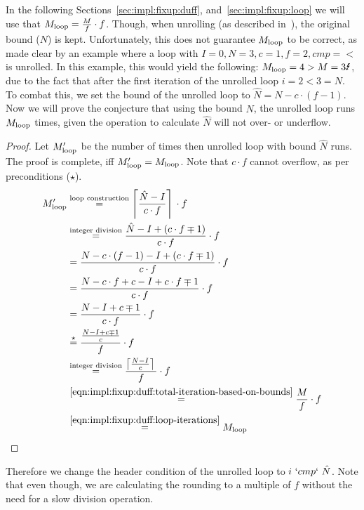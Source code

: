 In the following Sections~\ref{sec:impl:fixup:duff}, and~\ref{sec:impl:fixup:loop} we will use that $M_{\text{loop}} = \frac{M}{f} \cdot f$.
Though, when unrolling (as described in~), the original bound ($N$) is kept.
Unfortunately, this does not guarantee $M_{\text{loop}}$ to be correct, as made clear by an example where a loop with $I = 0, N = 3, c = 1, f = 2, cmp = <$ is unrolled.
In this example, this would yield the following: $\Mloop = 4 > M = 3 \mLightning$, due to the fact that after the first iteration of the unrolled loop $i = 2 < 3 = N$.
To combat this, we set the bound of the unrolled loop to $\hat{N} = N - c \cdot (f - 1)$.
Now we will prove the conjecture that using the bound $\hat{N}$, the unrolled loop runs $M_{\text{loop}}$ times, given the operation to calculate $\hat{N}$ will not over- or underflow.
\begin{proof}
    Let $M_{\text{loop}}'$ be the number of times then unrolled loop with bound $\hat{N}$ runs.
    The proof is complete, iff $M_{\text{loop}}' = M_{\text{loop}}$.
    Note that $c \cdot f$ cannot overflow, as per preconditions ($\star$).
    \begin{align*}
        M_{\text{loop}}' &\overset{\text{loop construction}}{=} \left\lceil{}\frac{\hat{N} - I}{c \cdot f}\right\rceil{} \cdot f\\
        &\overset{\text{integer division}}{=} \frac{\hat{N} - I + (c \cdot f \mp 1)}{c \cdot f} \cdot f\\
        &= \frac{N - c \cdot (f - 1) - I + (c \cdot f \mp 1)}{c \cdot f} \cdot f\\
        &= \frac{N - c \cdot f + c - I + c \cdot f \mp 1}{c \cdot f} \cdot f\\
        &= \frac{N - I + c \mp 1}{c \cdot f} \cdot f\\
        &\overset{\star}{=} \frac{\frac{N - I + c \mp 1}{c}}{f} \cdot f\\
        &\overset{\text{integer division}}{=} \frac{\left\lceil{}\frac{N - I}{c}\right\rceil{}}{f} \cdot f\\
        &\overset{\ref{eqn:impl:fixup:duff:total-iteration-based-on-bounds}}{=} \frac{M}{f} \cdot f\\
        &\overset{\ref{eqn:impl:fixup:duff:loop-iterations}}{=} M_{\text{loop}}
    \end{align*}
\end{proof}

Therefore we change the header condition of the unrolled loop to $i~`cmp`~\hat{N}$.
Note that even though, we are calculating the rounding to a multiple of $f$ without the need for a slow division operation.

